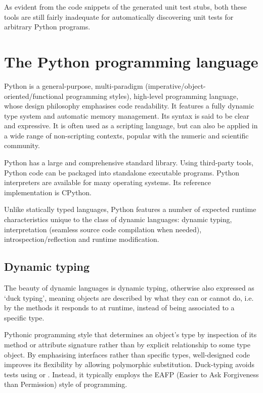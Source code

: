 \documentclass{icldt}
\numberwithin{equation}{section}       %
\begin{document}
{As evident from the code snippets of the generated unit test stubs, both these tools are still fairly inadequate for automatically discovering unit tests for arbitrary Python programs.

\section{The Python programming language}
\label{sect:bkgrd-python}

Python is a general-purpose, multi-paradigm (imperative/object-oriented/functional programming styles), high-level programming language, whose design philosophy emphasises code readability. It features a fully dynamic type system and automatic memory management. Its syntax is said to be clear and expressive. It is often used as a scripting language, but can also be applied in a wide range of non-scripting contexts, popular with the numeric and scientific community.

Python has a large and comprehensive standard library. Using third-party tools, Python code can be packaged into standalone executable programs. Python interpreters are available for many operating systems. Its reference implementation is CPython.

Unlike statically typed languages, Python features a number of expected runtime characteristics unique to the class of dynamic languages: dynamic typing, interpretation (seamless source code compilation when needed), introspection/reflection and runtime modification.

\subsection{Dynamic typing}
The beauty of dynamic languages is dynamic typing, otherwise also expressed as `duck typing', meaning objects are described by what they can or cannot do, i.e. by the methods it responds to at runtime, instead of being associated to a specific type.

Pythonic programming style that determines an object's type by inspection of its method or attribute signature rather than by explicit relationship to some type object. By emphasising interfaces rather than specific types, well-designed code improves its flexibility by allowing polymorphic substitution. Duck-typing avoids tests using  or . Instead, it typically employs the EAFP (Easier to Ask Forgiveness than Permission) style of programming.

}
\end{document}
